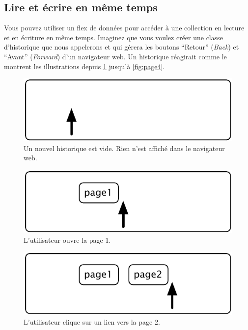 \documentclass[a4paper,10pt,twoside]{book}
\begin{document}
\subsection{Lire et \'ecrire en m\^eme temps}

Vous pouvez utiliser un flex de donn\'ees pour acc\'eder \`a une collection
en lecture et en \'ecriture en m\^eme temps.
Imaginez que vous voulez cr\'eer une classe d'historique que nous appelerons  et qui g\'erera
les boutons ``Retour'' (\emph{Back}) et ``Avant'' (\emph{Forward}) d'un
navigateur web.
Un historique r\'eagirait comme le montrent les illustrations depuis \ref{fig:emptyStream} jusqu'\`a \ref{fig:page4}.

\begin{figure}[!ht]
\centerline{\includegraphics[scale=0.5]{emptyStef}}
\caption{Un nouvel historique est vide. Rien n'est affich\'e dans le navigateur web.}
\label{fig:emptyStream}
\vspace{.2in}
\end{figure}

\begin{figure}[!ht]
\centerline{\includegraphics[scale=0.5]{page1Stef}}
\caption{L'utilisateur ouvre la page 1.}
\label{fig:page1}
\vspace{.2in}
\end{figure}

\begin{figure}[!ht]
\centerline{\includegraphics[scale=0.5]{page2Stef}}
\caption{L'utilisateur clique sur un lien vers la page 2.}
\label{fig:page2}
\vspace{.2in}
\end{figure}
\end{document}
